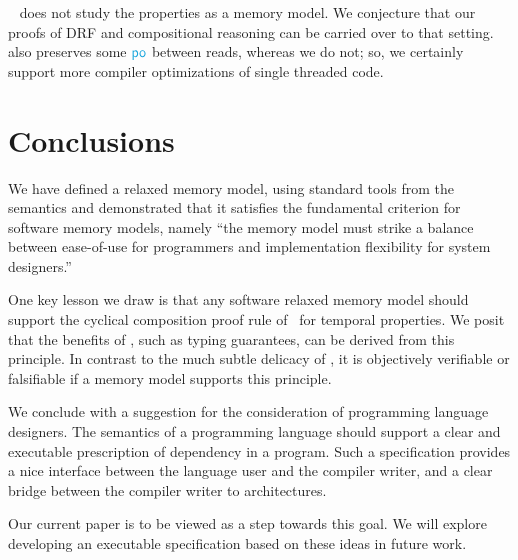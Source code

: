 ~\citet{2019-sp} does not study the properties as a memory model.  We conjecture that our proofs of DRF and compositional reasoning can be carried over to that setting.~\citet{2019-sp} also preserves some $\rpox$ between reads, whereas we do not; so, we certainly support more compiler optimizations of single threaded code. 


\section{Conclusions}
We have defined a relaxed memory model, using standard tools from the semantics and demonstrated that it satisfies the fundamental criterion for software memory models, namely ``the memory model must strike a balance between ease-of-use for programmers and implementation flexibility for system designers.''

One key lesson we draw is that any software relaxed memory model should support the cyclical composition proof rule of~\citet{Abadi:1993:CS:151646.151649}  for temporal properties.   We posit that the benefits of \oota, such as typing guarantees, can be derived from this principle.   In contrast to the much subtle delicacy of \oota,  it is objectively verifiable or falsifiable if a memory model supports this principle.  

We conclude with a suggestion for the consideration of programming language designers.   The semantics of a programming language should support a clear and executable prescription of dependency in a program.  Such a specification provides a nice interface between the language user and the compiler writer, and  a clear bridge  between the compiler writer to architectures.   

Our current paper is to be viewed as a step towards this goal.  We will explore developing an executable specification based on these ideas in future work.
 



